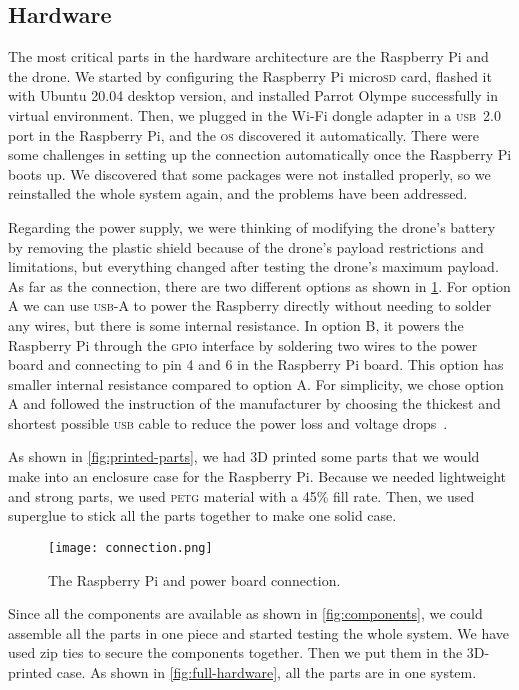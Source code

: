 \documentclass[../main.tex]{subfiles}
\begin{document}
\subsection{Hardware}

The most critical parts in the hardware
architecture are the Raspberry Pi and the drone. 
We started by configuring the Raspberry Pi micro\textsc{sd} card,
flashed it with Ubuntu 20.04 desktop version,
and installed Parrot Olympe successfully in virtual environment. 
Then, we plugged in the Wi-Fi dongle adapter
in a \textsc{usb}~2.0 port in the Raspberry Pi, 
and the \textsc{os} discovered it automatically. 
There were some challenges in setting up the connection automatically 
once the Raspberry Pi boots up. We discovered that some packages were not installed properly,
so we reinstalled the whole system again, and the problems have been addressed. 

Regarding the power supply, we were thinking 
of modifying the drone's battery by removing the 
plastic shield because of the drone's payload restrictions 
and limitations, but everything changed after testing 
the drone's maximum payload.
As far as the connection, there are 
two different options as shown in \cref{fig:connection}.
For option A we can use \textsc{usb}-A to power the Raspberry directly 
without needing to solder any wires, but there is some internal resistance.
In option B, it powers the Raspberry Pi through the \textsc{gpio} 
interface by soldering two wires to the power board and 
connecting to pin 4 and 6 in the Raspberry Pi board.
This option has smaller internal resistance compared to option A.
For simplicity, we chose option A and   
followed the instruction of the manufacturer by choosing 
the thickest and shortest possible \textsc{usb} cable to reduce 
the power loss and voltage drops~\cite{makerfocus}.

As shown in \cref{fig:printed-parts}, we had 3D printed some parts
that we would make into an enclosure case for the Raspberry Pi. 
Because we needed lightweight and strong parts, we used
\textsc{petg} material with a 45\% fill rate. 
Then, we used superglue to stick all the parts together to make one
solid case.

\begin{figure}[tbp]
	\centering
	\texttt{[image: connection.png]}
	\caption{The Raspberry Pi and power board connection.}
	\label{fig:connection}
\end{figure}  

Since all the components are available as shown 
in \cref{fig:components}, we could assemble 
all the parts in one piece and started testing the whole system.
We have used zip ties to secure the components together. 
Then we put them in the 3D-printed case. 
As shown in \cref{fig:full-hardware}, all the parts
are in one system. 
\end{document}
